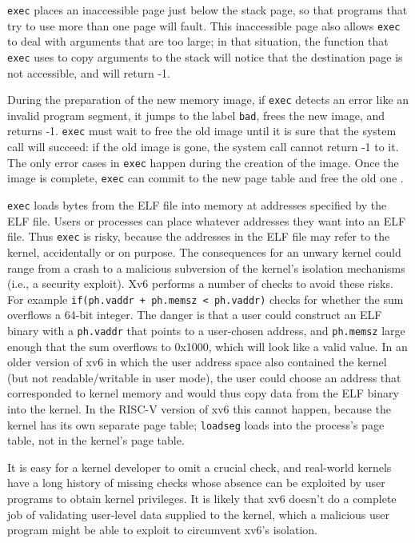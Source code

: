 \lstinline{exec}
places an inaccessible page just below the stack page,
so that programs that try to use more than one page will fault.
This inaccessible page also allows
\lstinline{exec}
to deal with arguments that are too large;
in that situation,
the
function that
\lstinline{exec}
uses to copy arguments to the stack will notice that
the destination page is not accessible, and will
return -1.

During the preparation of the new memory image,
if
\lstinline{exec}
detects an error like an invalid program segment,
it jumps to the label
\lstinline{bad},
frees the new image,
and returns -1.
\lstinline{exec}
must wait to free the old image until it
is sure that the system call will succeed:
if the old image is gone,
the system call cannot return -1 to it.
The only error cases in
\lstinline{exec}
happen during the creation of the image.
Once the image is complete,
\lstinline{exec}
can commit to the new page table
and free the old one
.

\lstinline{exec}
loads bytes from the ELF file into memory at addresses specified by the ELF file.
Users or processes can place whatever addresses they want into an ELF file.
Thus
\lstinline{exec}
is risky, because the addresses in the ELF file may refer to the kernel, accidentally
or on purpose. The consequences for an unwary kernel could range from
a crash to a malicious subversion of the kernel's isolation mechanisms
(i.e., a security exploit).
Xv6 performs a number of checks to avoid these risks.
For example
\lstinline{if(ph.vaddr + ph.memsz < ph.vaddr)}
checks for whether the sum overflows a 64-bit integer.
The danger is that a user could construct an ELF binary with a
\lstinline{ph.vaddr}
that points to a user-chosen address,
and
\lstinline{ph.memsz}
large enough that the sum overflows to 0x1000, which will look like a
valid value. In an older version of xv6 in which the user address
space also contained the kernel (but not readable/writable in user
mode), the user could choose an address that corresponded to kernel
memory and would thus copy data from the ELF binary into the kernel.
In the RISC-V version of xv6 this cannot happen, because the kernel has
its own separate page table;
\lstinline{loadseg}
loads into the process's page table, not in the kernel's page table.

It is easy for a kernel developer to omit a crucial check, and
real-world kernels have a long history of missing checks whose absence
can be exploited by user programs to obtain kernel privileges.  It is likely that xv6 doesn't do a complete job of validating
user-level data supplied to the kernel, which a malicious user program might be able to exploit to circumvent xv6's isolation.
